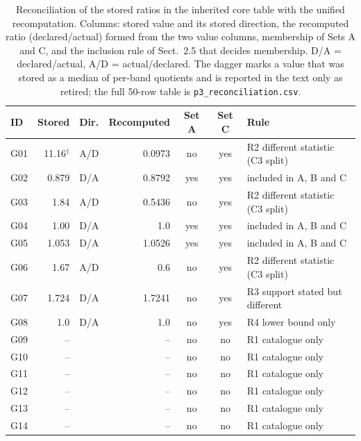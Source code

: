 \begin{table}[t]
\caption{Reconciliation of the stored ratios in the inherited core table with the unified recomputation. Columns: stored value and its stored direction, the recomputed ratio (declared/actual) formed from the two value columns, membership of Sets A and C, and the inclusion rule of Sect.~2.5 that decides membership. D/A = declared/actual, A/D = actual/declared. The dagger marks a value that was stored as a median of per-band quotients and is reported in the text only as retired; the full 50-row table is \texttt{p3\_reconciliation.csv}.}\label{tab:5}
\footnotesize
\begin{tabular}{@{}l r l r c c p{3.4cm}@{}}
\toprule
ID & Stored & Dir. & Recomputed & Set A & Set C & Rule \\
\midrule
G01 & 11.16$^{\dagger}$ & A/D & 0.0973 & no & yes & R2 different statistic (C3 split) \\
G02 & 0.879 & D/A & 0.8792 & yes & yes & included in A, B and C \\
G03 & 1.84 & A/D & 0.5436 & no & yes & R2 different statistic (C3 split) \\
G04 & 1.00 & D/A & 1.0 & yes & yes & included in A, B and C \\
G05 & 1.053 & D/A & 1.0526 & yes & yes & included in A, B and C \\
G06 & 1.67 & A/D & 0.6 & no & yes & R2 different statistic (C3 split) \\
G07 & 1.724 & D/A & 1.7241 & no & yes & R3 support stated but different \\
G08 & 1.0 & D/A & 1.0 & no & yes & R4 lower bound only \\
G09 & -- &  & -- & no & no & R1 catalogue only \\
G10 & -- &  & -- & no & no & R1 catalogue only \\
G11 & -- &  & -- & no & no & R1 catalogue only \\
G12 & -- &  & -- & no & no & R1 catalogue only \\
G13 & -- &  & -- & no & no & R1 catalogue only \\
G14 & -- &  & -- & no & no & R1 catalogue only \\
\bottomrule
\end{tabular}
\end{table}
